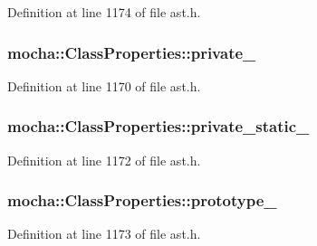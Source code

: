 Definition at line 1174 of file ast.h.

\hypertarget{classmocha_1_1_class_properties_ae57de33463b6c6a592eb23497bcc13b7}{
\subsubsection[{private\_\-}]{ {\bf mocha::ClassProperties::private\_\-}}}
\label{classmocha_1_1_class_properties_ae57de33463b6c6a592eb23497bcc13b7}


Definition at line 1170 of file ast.h.

\hypertarget{classmocha_1_1_class_properties_a83646affe1aeaeb0b3609a628f6110b0}{
\subsubsection[{private\_\-static\_\-}]{ {\bf mocha::ClassProperties::private\_\-static\_\-}}}
\label{classmocha_1_1_class_properties_a83646affe1aeaeb0b3609a628f6110b0}


Definition at line 1172 of file ast.h.

\hypertarget{classmocha_1_1_class_properties_a8a8d620fed2fdcc7a2255a6e71b98fa8}{
\subsubsection[{prototype\_\-}]{ {\bf mocha::ClassProperties::prototype\_\-}}}
\label{classmocha_1_1_class_properties_a8a8d620fed2fdcc7a2255a6e71b98fa8}


Definition at line 1173 of file ast.h.

